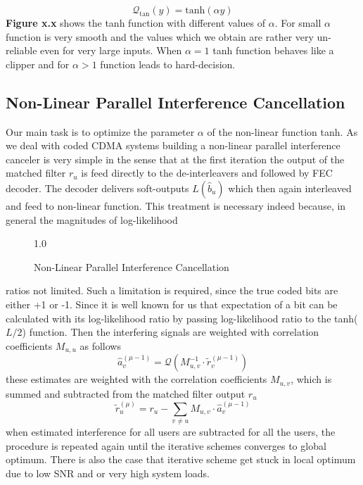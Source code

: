 \begin{equation}
\mathcal{Q}_{\mathrm{tan}}(y)=\mathrm{tanh}(\alpha y)
\end{equation}
\textbf{Figure x.x} shows the tanh function with different values of $\alpha$. For small $\alpha$ function is very smooth and the values which we obtain are rather very un-reliable even for very large inputs. When $\alpha=1$ tanh function behaves like a clipper and for $\alpha>1$ function leads to hard-decision.
\subsection{Non-Linear Parallel Interference Cancellation}
Our main task is to optimize the parameter $\alpha$ of the non-linear function tanh. As we deal with coded CDMA systems building a non-linear parallel interference canceler is very simple in the sense that at the first iteration the output of the matched filter $r_u$ is feed directly to the de-interleavers and followed by FEC decoder. The decoder delivers soft-outputs $L(\hat{b}_u)$ which then again interleaved and feed to non-linear function. This treatment is necessary indeed because, in general the magnitudes of log-likelihood
\begin{figure}[htb]
\centerline{  {1.0} }
\caption{Non-Linear Parallel Interference Cancellation}
\end{figure}
ratios not limited. Such a limitation is required, since the true coded bits are either +1 or -1. Since it is well known for us that expectation of a bit can be calculated with its log-likelihood ratio by passing log-likelihood ratio to the tanh($L/2$) function. Then the interfering signals are weighted with correlation coefficients $M_{u,u}$ as follows
\begin{equation}
\hat{a}_v^{(\mu-1)}=\mathcal{Q}\left(M_{u,v}^{-1}\cdot \tilde{r}_v^{(\mu-1)}\right)
\end{equation}
these estimates are weighted with the correlation coefficients $M_{u,v}$, which is summed and subtracted from the matched filter output $r_u$
\begin{equation}
\tilde{r}_u^{(\mu)}=r_u-\sum\limits_{v\ne u}M_{u,v}\cdot \hat{a}_v^{(\mu-1)}
\end{equation}
when estimated interference for all users are subtracted for all the users, the procedure is repeated again until the iterative schemes converges to global optimum. There is also the case that iterative scheme get stuck in local optimum due to low SNR and or very high system loads.
